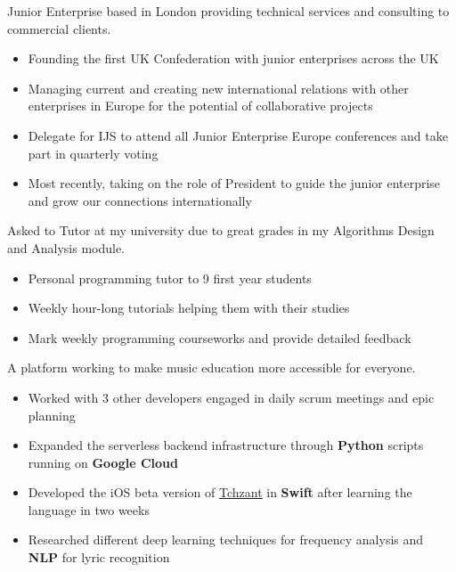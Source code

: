 \documentclass{my_cv}
\begin{document}
\newpage

Junior Enterprise based in London providing technical services and consulting to commercial clients.

\begin{itemize}
\itemsep0em 
\item Founding the first UK Confederation with junior enterprises across the UK
\item Managing current and creating new international relations with other enterprises in Europe for the potential of collaborative projects
\item Delegate for IJS to attend all Junior Enterprise Europe conferences and take part in quarterly voting
\item Most recently, taking on the role of President to guide the junior enterprise and grow our connections internationally
\end{itemize}

Asked to Tutor at my university due to great grades in my Algorithms Design and Analysis module. 
\begin{itemize}
\itemsep0em 
\item Personal programming tutor to 9 first year students
\item Weekly hour-long tutorials helping them with their studies
\item Mark weekly programming courseworks and provide detailed feedback
\end{itemize}


A platform working to make music education more accessible for everyone.

\begin{itemize}
\itemsep0em 
\item Worked with 3 other developers engaged in daily scrum meetings and epic planning
\item Expanded the serverless backend infrastructure through \textbf{Python} scripts running on \textbf{Google Cloud}
\item Developed the iOS beta version of \underline{\href{https://thechoralhub.com/app}{Tchzant}} in \textbf{Swift} after learning the language in two weeks
\item Researched different deep learning techniques for frequency analysis and \textbf{NLP} for lyric recognition
\end{itemize}
\end{document}
